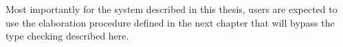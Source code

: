 Most importantly for the system described in this thesis, users are expected to use the elaboration procedure defined in the next chapter that will bypass the type checking described here.
